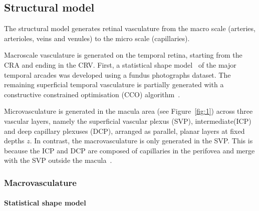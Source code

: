 \documentclass[11pt,]{article}
\begin{document}
\subsection{Structural model}\label{sec:structModel}

The structural model generates retinal vasculature from the macro
scale (arteries, arterioles, veins and venules) to the micro scale
(capillaries).

Macroscale vasculature is generated on the temporal retina, starting
from the CRA and ending in the CRV.
First, a statistical shape model~\cite{Davies_2008}
of the major temporal arcades was developed using a fundus
photographs dataset.  The remaining superficial temporal vasculature is
partially generated with a constructive constrained optimisation (CCO)
algorithm~\cite{Talou2021}.

Microvasculature is generated in the macula area (see
Figure~\ref{fig:1}) across three vascular layers, namely the superficial
vascular plexus (SVP), intermediate(ICP) and deep capillary plexuses
(DCP), arranged as parallel, planar layers at fixed depths \(z\).
In contrast, the macrovasculature is only generated in the SVP.
This is because the ICP and DCP are composed of capillaries in the perifovea and merge with the SVP outside the macula~\cite{An2021}.

\subsubsection{Macrovasculature}

\paragraph{Statistical shape model}
\end{document}
